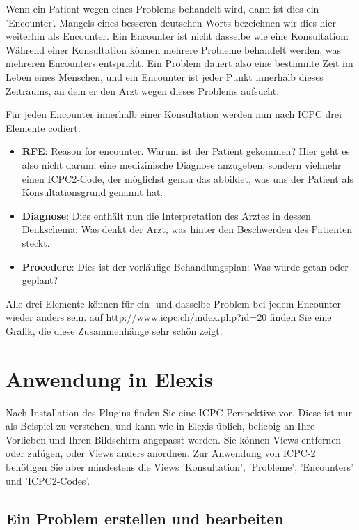 \documentclass[a4paper]{scrartcl}
\begin{document}
\medskip

Wenn ein Patient wegen eines Problems behandelt wird, dann ist dies ein 'Encounter'. Mangels eines besseren deutschen Worts bezeichnen wir dies hier weiterhin als Encounter. Ein Encounter ist nicht dasselbe wie eine Konsultation: Während einer Konsultation können mehrere Probleme behandelt werden, was mehreren Encounters entspricht. Ein Problem dauert also eine bestimmte Zeit im Leben eines Menschen, und ein Encounter ist jeder Punkt innerhalb dieses Zeitraums, an dem er den Arzt wegen dieses Problems aufsucht.

\medskip

Für jeden Encounter innerhalb einer Konsultation werden nun nach ICPC drei Elemente codiert:
\begin{itemize}
\item \textbf{RFE}: Reason for encounter. Warum ist der Patient gekommen? Hier geht es also nicht darum, eine medizinische Diagnose anzugeben, sondern vielmehr einen ICPC2-Code, der möglichst genau das abbildet, was uns der Patient als Konsultationsgrund genannt hat.
\item \textbf{Diagnose}: Dies enthält nun die Interpretation des Arztes in dessen Denkschema: Was denkt der Arzt, was hinter den Beschwerden des Patienten steckt.
\item \textbf{Procedere}: Dies ist der vorläufige Behandlungsplan: Was wurde getan oder geplant?
\end{itemize}

Alle drei Elemente können für ein- und dasselbe Problem bei jedem Encounter wieder anders sein. auf http://www.icpc.ch/index.php?id=20 finden Sie eine Grafik, die diese Zusammenhänge sehr schön zeigt.

\section{Anwendung in Elexis}
Nach Installation des Plugins finden Sie eine ICPC-Perspektive vor. Diese ist nur als Beispiel zu verstehen, und kann wie in Elexis üblich, beliebig an Ihre Vorlieben und Ihren Bildschirm angepasst werden. Sie können Views entfernen oder zufügen, oder Views anders anordnen.
Zur Anwendung von ICPC-2 benötigen Sie aber mindestens die Views 'Konsultation', 'Probleme', 'Encounters' und 'ICPC2-Codes'.

\subsection{Ein Problem erstellen und bearbeiten}
\end{document}
